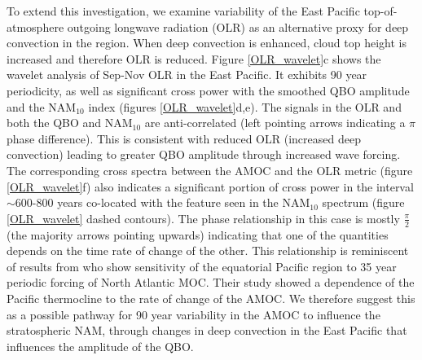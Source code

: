 To extend this investigation, we examine variability of the East Pacific top-of-atmosphere outgoing longwave radiation (OLR) as an alternative proxy for deep convection in the region. When deep convection is enhanced, cloud top height is increased and therefore OLR is reduced. Figure \ref{OLR_wavelet}c shows the wavelet analysis of Sep-Nov  OLR in the East Pacific. It exhibits 90 year periodicity, as well as significant cross power with the smoothed QBO amplitude and the NAM$_{10}$ index (figures \ref{OLR_wavelet}d,e). The signals in the OLR and both the QBO and NAM$_{10}$ are anti-correlated (left pointing arrows indicating a $\pi$ phase difference). This is consistent with reduced OLR (increased deep convection) leading to greater QBO amplitude through increased wave forcing.  The corresponding cross spectra between the AMOC and the OLR metric (figure \ref{OLR_wavelet}f) also indicates a significant portion of cross power in the interval $\sim$600-800 years co-located with the feature seen in the NAM$_{10}$ spectrum (figure \ref{OLR_wavelet} dashed contours). The phase relationship in this case is mostly $\frac{\pi}{2}$ (the majority arrows pointing upwards) indicating that one of the quantities depends on the time rate of change of the other. This relationship is reminiscent of results from \cite{timmermannENSO2005} who show sensitivity of the equatorial Pacific region to 35 year periodic forcing of North Atlantic MOC. Their study showed a dependence of the Pacific thermocline to the rate of change of the AMOC. We therefore suggest this as a possible pathway for 90 year variability in the AMOC to influence the stratospheric NAM, through changes in deep convection in the East Pacific that influences the amplitude of the QBO. 


